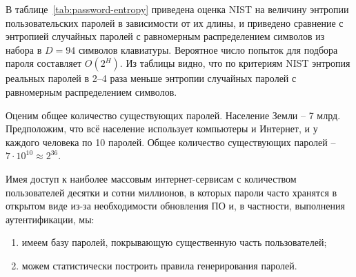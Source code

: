 \begin{table}[!ht]
    \caption{Оценка NIST предполагаемой энтропии паролей\label{tab:password-entropy}}
\end{table}

В таблице~\ref{tab:password-entropy} приведена оценка NIST на величину энтропии пользовательских паролей в зависимости от их длины, и приведено сравнение с энтропией случайных паролей с равномерным распределением символов из набора в $D=94$ символов клавиатуры. Вероятное число попыток для подбора пароля составляет $O(2^H)$. Из таблицы видно, что по критериям NIST энтропия реальных паролей в 2--4 раза меньше энтропии случайных паролей с равномерным распределением символов.

\example
Оценим общее количество существующих паролей. Население Земли -- 7 млрд. Предположим, что всё население использует компьютеры и Интернет, и у каждого человека по 10 паролей. Общее количество существующих паролей -- $7 \cdot 10^{10} \approx 2^{36}$.

Имея доступ к наиболее массовым интернет-сервисам с количеством пользователей десятки и сотни миллионов, в которых пароли часто хранятся в открытом виде из-за необходимости обновления ПО и, в частности, выполнения аутентификации, мы:
\begin{enumerate}
	\item имеем базу паролей, покрывающую существенную часть пользователей; 
	\item можем статистически построить правила генерирования паролей.
\end{enumerate}

